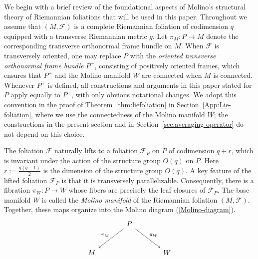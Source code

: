 \documentclass[reqno, 11pt]{amsart}
\theoremstyle{definition}
\theoremstyle{property}
\theoremstyle{remark}
\numberwithin{equation}{section}
\begin{document}
We begin with a brief review of the foundational aspects of Molino's structural
theory of Riemannian foliations \cite{Mo88} that will be used in this paper.
Throughout we assume that $(M,\mathcal F)$ is a complete Riemannian foliation of
codimension $q$ equipped with a transverse Riemannian metric $g$. Let
$\pi_M:P\to M$ denote the corresponding transverse orthonormal frame bundle on
$M$. When $\mathcal F$ is transversely oriented, one may replace $P$ with the
\emph{oriented transverse orthonormal frame bundle} $P^+$, consisting of
positively oriented frames, which ensures that $P^+$ and the Molino manifold
$W$ are connected when $M$ is connected. Whenever $P^+$ is defined, all
constructions and arguments in this paper stated for $P$ apply equally to
$P^+$, with only obvious notational changes. We adopt this convention in the
proof of Theorem~\ref{thm:liefoliation} in Section~\ref{App:Lie-foliation},
where we use the connectedness of the Molino manifold $W$; the constructions in
the present section and in Section~\ref{sec:averaging-operator} do not depend on
this choice.



 The foliation $\mathcal{F}$ naturally lifts to a foliation $\mathcal{F}_P$ on $P$ of codimension $q+r$, which is invariant under the action of the structure group $O(q)$ on $P$. Here $r:=\frac{q(q-1)}{2}$ is the dimension of the structure group $O(q)$. A key feature of the lifted foliation $ \mathcal{F}_P$ is that it is transversely parallelizable. Consequently, there is a fibration $\pi_W: P\rightarrow W$ whose fibers are precisely the leaf closures of $\mathcal{F}_P$. The base manifold $W$ is called the \emph{Molino manifold} of the Riemannian foliation $(M, \mathcal{F})$. 
Together, these maps organize into the Molino diagram (\ref{Molino-diagram}).
\begin{equation} \label{Molino-diagram}
\begin{tikzcd}[column sep=large, row sep=large]
& P \arrow[dl, "\pi_M"'] \arrow[dr, "\pi_W"] & \\
M & & W
\end{tikzcd}
\end{equation}
\end{document}
